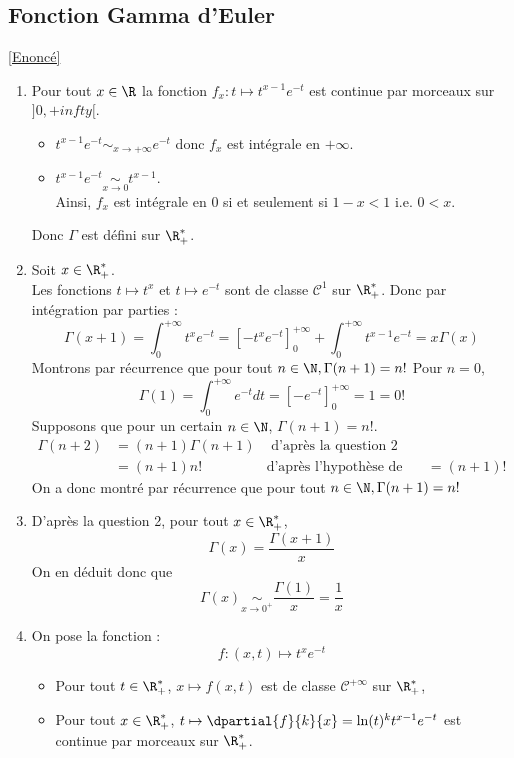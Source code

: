 \documentclass{book}
\begin{document}
	\subsection{Fonction Gamma d'Euler}\label{sec:fonction-gamma-deuler}
	\textcolor{blue}{\hyperref[Fonction Gamma d'Euler]{[Enoncé]}}\\
	\label{Gamma}
	\begin{enumerate}[leftmargin=*]
		\item Pour tout $x\in\R$ la fonction $f_x :t\mapsto t^{x-1}e^{-t}$ est continue par morceaux sur $]0,+infty[$.
		\begin{itemize}
			\item $t^{x-1}e^{-t}\sim_{x\to+\infty}e^{-t}$ donc $f_x$ est intégrale en $+\infty$.
			\item $t^{x-1}e^{-t} \underset{x\to 0}{\sim}t^{x-1}$.\\
			Ainsi, $f_x$ est intégrale en $0$ si et seulement si $1-x<1$ i.e. $0<x$.
		\end{itemize}
		Donc $\Gamma$ est défini sur $\R^*_+$.
		\item Soit $x\in\R^*_+$.\\ 
		Les fonctions $t\mapsto t^x$ et $t\mapsto e^{-t}$ sont de classe $\mathcal{C}^1$ sur $\R^*_+$. Donc par intégration par parties :
		\[\Gamma(x+1)=\int_{0}^{+\infty}t^xe^{-t}=[-t^xe^{-t}]^{+\infty}_0+ \int_{0}^{+\infty}t^{x-1}e^{-t}=x\Gamma(x)\]
		Montrons par récurrence que pour tout $n\in\N, \Gamma(n+1)=n!$
		Pour $n=0$, \[\Gamma(1)=\int_{0}^{+\infty}e^{-t}dt=[-e^{-t}]^{+\infty}_0=1=0!\]
		Supposons que pour un certain $n\in\N$, $\Gamma(n+1)=n!$.
		\begin{align*}
			\Gamma(n+2)&=(n+1)\Gamma(n+1) &\text{ d'après la question 2}\\
			&=(n+1)n!&\text{d'après l'hypothèse de récurrence}
			&=(n+1)!
		\end{align*}
		On a donc montré par récurrence que pour tout $n\in\N,\Gamma(n+1)=n!$
		\item D'après la question 2, pour tout $x\in\R^*_+$, \[\Gamma(x)=\frac{\Gamma(x+1)}{x}\]
		On en déduit donc que \[\Gamma(x)\underset{x\to 0^+}{\sim}\frac{\Gamma(1)}{x}=\frac{1}{x}\]
		\item On pose la fonction :\[f:(x,t)\mapsto t^xe^{-t}\]
		\begin{itemize}
			\item Pour tout $t\in\R^*_+$, $x\mapsto f(x,t)$ est de classe $\mathcal{C}^{+\infty}$ sur $\R^*_+$,
			\item Pour tout $x\in\R^*_+$, $t\mapsto \dpartial{f}{k}{x}=\ln(t)^kt^{x-1}e^{-t}$ est continue par morceaux sur $\R^*_+$.

\end{itemize}
\end{enumerate}
\end{document}
